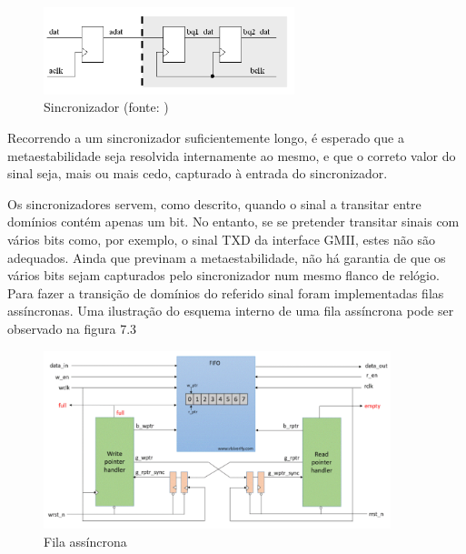 \begin{figure}[!htb]
  \centering
  \includegraphics[width=0.65\textwidth]{synch.png}
  \caption[Sincronizador ]{Sincronizador (fonte: \cite{CDC})}
  \label{fig:airbus1}
\end{figure}


Recorrendo a um sincronizador suficientemente longo, é esperado que a metaestabilidade seja resolvida internamente ao mesmo, e que o correto valor do sinal seja, mais ou mais cedo, capturado à entrada do sincronizador. \par
Os sincronizadores servem, como descrito, quando o sinal a transitar entre domínios contém apenas um bit. No entanto, se se pretender transitar sinais com vários bits como, por exemplo, o sinal TXD da interface GMII, estes não são adequados. Ainda que previnam a metaestabilidade, não há garantia de que os vários bits sejam capturados pelo sincronizador num mesmo flanco de relógio. Para fazer a transição de domínios do referido sinal foram implementadas filas assíncronas. Uma ilustração do esquema interno de uma fila assíncrona pode ser observado na figura 7.3

\begin{figure}[h]
  \centering
  \includegraphics[width=0.9\textwidth]{AsyncFIFO.png}
  \caption[Fila assíncrona]{Fila assíncrona}
  \label{fig:airbus1}
\end{figure}


